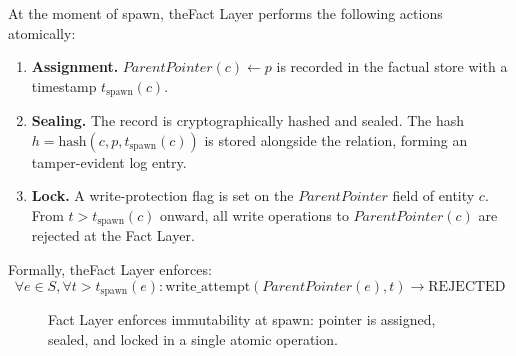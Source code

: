 \begin{invariant}
At the moment of spawn, theFact Layer performs the following actions atomically:

\begin{enumerate}
    \item \textbf{Assignment.} $ParentPointer(c) \leftarrow p$ is recorded in the factual store with a timestamp $t_{\text{spawn}}(c)$.
    \item \textbf{Sealing.} The record is cryptographically hashed and sealed. The hash $h = \text{hash}(c, p, t_{\text{spawn}}(c))$ is stored alongside the relation, forming an tamper-evident log entry.
    \item \textbf{Lock.} A write-protection flag is set on the $ParentPointer$ field of entity $c$. From $t > t_{\text{spawn}}(c)$ onward, all write operations to $ParentPointer(c)$ are rejected at the Fact Layer.
\end{enumerate}

Formally, theFact Layer enforces:
\[
\forall e \in S, \forall t > t_{\text{spawn}}(e) : \text{write\_attempt}(ParentPointer(e), t) \rightarrow \text{REJECTED}
\]
\end{invariant}

\begin{figure}[H]
\centering
{}
\caption{Fact Layer enforces immutability at spawn: pointer is assigned, sealed, and locked in a single atomic operation.}
\label{fig:fact-layer-immutability}
\end{figure}

